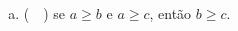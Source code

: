 \documentclass[a4paper,14pt]{article}
\begin{document}
\begin{multicols}{2}
\begin{enumerate}
\begin{enumerate}[a)]
				\item (~~) se $a \geq b$ e $a \geq c$, então $b \geq c$.
			\end{enumerate}
		\end{enumerate}
		$~$ \\ $~$ \\ $~$ \\ $~$ \\ $~$ \\ $~$ \\ $~$ \\ $~$ \\ $~$ \\ $~$ \\ $~$ \\ $~$ \\ $~$ \\ $~$ \\ $~$ \\ $~$ \\ $~$ \\ $~$ \\ $~$ \\ $~$ \\ $~$ \\ $~$ \\ $~$ \\ $~$ \\ $~$ \\ $~$ \\ $~$ \\ $~$ \\ $~$ \\ $~$ \\ $~$ \\ $~$ \\ $~$ \\
	\end{multicols}
\end{document}
